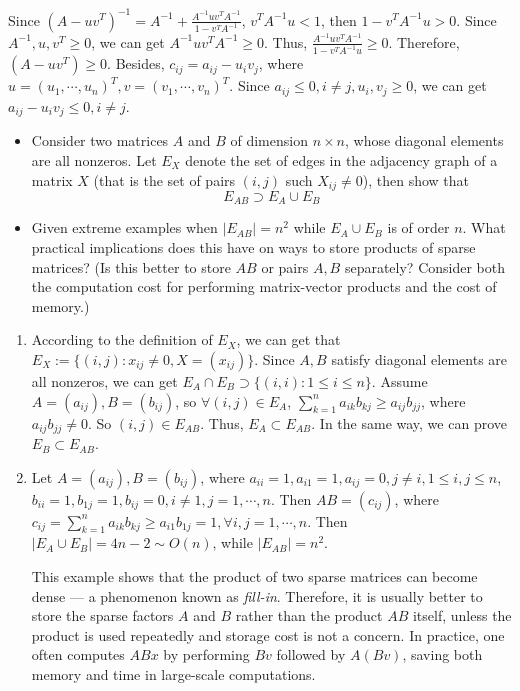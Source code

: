 \documentclass{ctexart}
\begin{document}
\begin{solution}
  Since \((A-uv^T)^{-1}=A^{-1}  + \frac{A^{-1}uv^TA^{-1}}{1-v^TA^{-1}} \), \( v^TA^{-1}u <1 \), then \(1-v^TA^{-1}u >0 \). 
  Since \(A^{-1},u, v^T \geq 0 \), we can get \(A^{-1}uv^TA^{-1} \geq 0 \). Thus, \(\frac{A^{-1}uv^TA^{-1}}{1-v^TA^{-1}u} \geq0 \). 
  Therefore, \((A-uv^T)\geq0 \). Besides, \(c_{ij}=a_{ij}-u_iv_j \), where \(u=(u_1,\cdots,u_n)^T,v=(v_1,\cdots,v_n)^T \). 
  Since \(a_{ij}\leq 0, i \neq j, u_i,v_j \geq 0 \), we can get \(  a_{ij} - u_iv_j \leq 0, i \neq j\).
\end{solution}

 \begin{problem} 
   \begin{itemize}
     \item   Consider two matrices \(A \) and \(B \) of dimension \(n \times n \), whose diagonal 
       elements are all nonzeros. Let \(E_X \) denote the set of edges in the 
       adjacency graph of a matrix \(X \) (that is the set of pairs \((i,j) \) 
       such \(  X_{ij} \neq 0\)), then show that \[
         E_{AB} \supset E_A \cup  E_B
       \]
     \item Given extreme examples when \(|E_{AB}| =n^2 \) while \(E_A \cup E_B \) is of 
       order \(n \). What practical implications does this have on ways to store 
       products of sparse matrices? (Is this better to store \(AB \) or pairs \(A,B \) 
       separately? Consider both the computation cost for performing matrix-vector 
       products and the cost of memory.)
   \end{itemize}
 \end{problem}
 \begin{solution}
  \begin{enumerate}
    \item According to the definition of \(E_X \), we can get that \( E_X :=\{(i,j):x_{ij} \neq 0, X=(x_{ij})\} \). 
      Since \(A,B \) satisfy diagonal elements are all nonzeros, we can get \(E_A \cap E_B \supset \{(i,i):1 \leq i \leq n\} \).
      Assume \(A =(a_{ij}),B=(b_{ij}) \), so \(\forall (i,j) \in E_{A} \), \(\sum_{k=1}^{n}a_{ik}b_{kj} \geq a_{ij}b_{jj}  \), where \(a_{ij}b_{jj} \neq 0 \).
      So \((i,j) \in E_{AB} \). Thus, \(E_{A} \subset E_{AB} \). In the same way, we can prove \(E_{B} \subset E_{AB} \).
    \item Let \(A=(a_{ij}), B=(b_{ij}) \), where \(a_{ii}=1,a_{i 1}=1,a_{ij}=0, j \neq i, 1 \leq i,j \leq n \), 
      \(b_{ii}=1,  b_{1j}=1, b_{ij}=0, i \neq 1, j=1,\cdots,n \).  Then \(AB=(c_{ij}) \), where \(c_{ij}=\sum_{k=1}^{n}a_{ik}b_{kj} \geq a_{i 1}b_{1j}=1, \forall i,j=1,\cdots,n   \).
      Then \(|E_{A} \cup E_{B}| =4n-2 \sim O(n) \), while \(|E_{AB}|= n^2\). 

      This example shows that the product of two sparse matrices can become dense — a phenomenon known as \emph{fill-in}.  
Therefore, it is usually better to store the sparse factors \(A\) and \(B\) rather than the product \(AB\) itself, unless the product is used repeatedly and storage cost is not a concern.  
In practice, one often computes \(ABx\) by performing \(Bv\) followed by \(A(Bv)\), saving both memory and time in large-scale computations.
  \end{enumerate}
 \end{solution}
\end{document}
